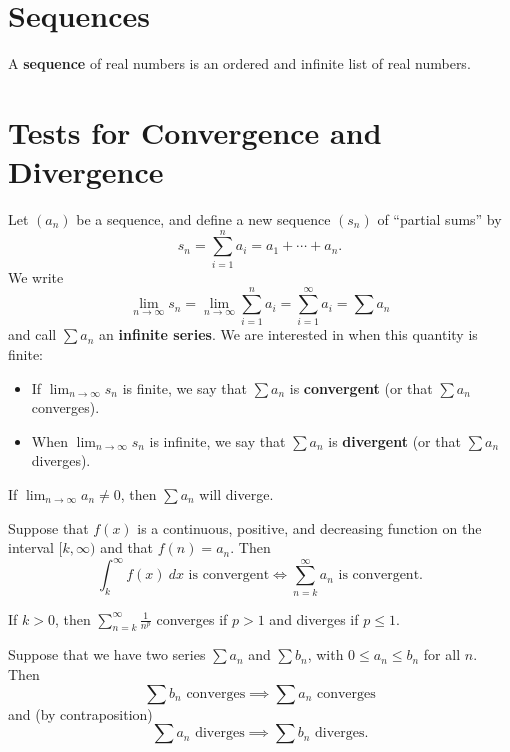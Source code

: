\section{Sequences}

A \textbf{sequence} of real numbers is an ordered and infinite list of real numbers.



\section{Tests for Convergence and Divergence}



Let $(a_n)$ be a sequence, and define a new sequence $(s_n)$ of ``partial sums'' by
$$s_n=\sum_{i=1}^n a_i = a_1 + \cdots + a_n.$$
We write 
$$\lim _{n \to \infty} s_{n}=\lim _{n \to \infty} \sum_{i=1}^{n} a_{i}=\sum_{i=1}^{\infty} a_{i}=\sum a_n$$
and call $\sum a_n$ an \textbf{infinite series}. We are interested in when this quantity is finite:
\begin{itemize}
    \item If $\lim _{n \to \infty} s_{n}$ is finite, we say that $\sum a_n$ is \textbf{convergent} (or that $\sum a_n$ converges).
    \item  When $\lim _{n \to \infty} s_{n}$ is infinite, we say that $\sum a_n$ is \textbf{divergent} (or that $\sum a_n$ diverges).
\end{itemize}

\vspace{.5em}

\begin{thm} If $\displaystyle \lim_{n\to\infty}a_n\neq 0$, then $\sum a_n$ will diverge.
\end{thm}


\begin{thm}
Suppose that $f(x)$ is a continuous, positive, and decreasing function on the interval $[k,\infty)$ and that $f(n)=a_n$. Then
$$\int_k^\infty f(x)\ dx\text{ is convergent} \iff \sum_{n=k}^\infty a_n\text{ is convergent}.$$
\end{thm}


\begin{thm}
If $k>0$, then $\sum_{n=k}^\infty\frac{1}{n^p}$ converges if $p>1$ and diverges if $p\leq 1$.
\end{thm}




\begin{thm}
Suppose that we have two series $\sum a_n$ and $\sum b_n$, with $0\leq a_n\leq b_n$ for all $n$. Then
$$\sum b_n\text{ converges}\implies \sum a_n\text{ converges}$$
and (by contraposition)
$$\sum a_n\text{ diverges}\implies \sum b_n\text{ diverges}.$$
\end{thm}




